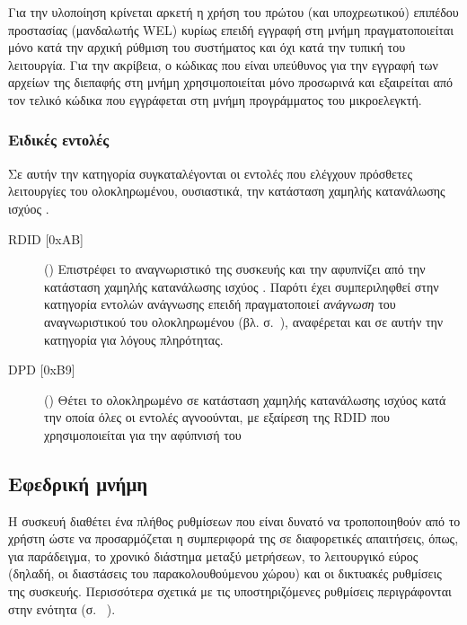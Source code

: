Για την υλοποίηση κρίνεται αρκετή η χρήση του πρώτου (και υποχρεωτικού) επιπέδου
προστασίας (μανδαλωτής WEL) κυρίως επειδή εγγραφή στη μνήμη πραγματοποιείται
μόνο κατά την αρχική ρύθμιση του συστήματος και όχι κατά την τυπική του
λειτουργία. Για την ακρίβεια, ο κώδικας που είναι υπεύθυνος για την εγγραφή των
αρχείων της διεπαφής στη μνήμη χρησιμοποιείται μόνο προσωρινά και εξαιρείται από
τον τελικό κώδικα που εγγράφεται στη μνήμη προγράμματος του μικροελεγκτή.


\subsubsection{Ειδικές εντολές}
\label{ssubsec:25lc1024:special-commands}

Σε αυτήν την κατηγορία συγκαταλέγονται οι εντολές που ελέγχουν πρόσθετες
λειτουργίες του ολοκληρωμένου, ουσιαστικά, την κατάσταση χαμηλής κατανάλωσης
ισχύος \parencite[16]{25lc1024}.

\begin{description}
    \item[RDID [0xAB{]}] () Επιστρέφει το αναγνωριστικό της συσκευής
    και την αφυπνίζει από την κατάσταση χαμηλής κατανάλωσης ισχύος
    \parencite[17]{25lc1024}. Παρότι έχει συμπεριληφθεί στην κατηγορία εντολών
    ανάγνωσης επειδή πραγματοποιεί \emph{ανάγνωση} του αναγνωριστικού του
    ολοκληρωμένου (βλ. σ.~\pageref{ssubsec:25lc1024:read-commands:rdid}),
    αναφέρεται και σε αυτήν την κατηγορία για λόγους πληρότητας.

    \item[DPD [0xB9{]}] () Θέτει το ολοκληρωμένο σε
    κατάσταση χαμηλής κατανάλωσης ισχύος κατά την οποία όλες οι εντολές
    αγνοούνται, με εξαίρεση της RDID που χρησιμοποιείται για την αφύπνισή του
    \parencite[16]{25lc1024}
\end{description}


\subsection{Εφεδρική μνήμη}
\label{subsec:backup-memory}

Η συσκευή διαθέτει ένα πλήθος ρυθμίσεων που είναι δυνατό να τροποποιηθούν από το
χρήστη ώστε να προσαρμόζεται η συμπεριφορά της σε διαφορετικές απαιτήσεις, όπως,
για παράδειγμα, το χρονικό διάστημα μεταξύ μετρήσεων, το λειτουργικό εύρος
(δηλαδή, οι διαστάσεις του παρακολουθούμενου χώρου) και οι δικτυακές ρυθμίσεις
της συσκευής. Περισσότερα σχετικά με τις υποστηριζόμενες ρυθμίσεις περιγράφονται
στην ενότητα  (σ.~%
\pageref{subsec:network:config}).

